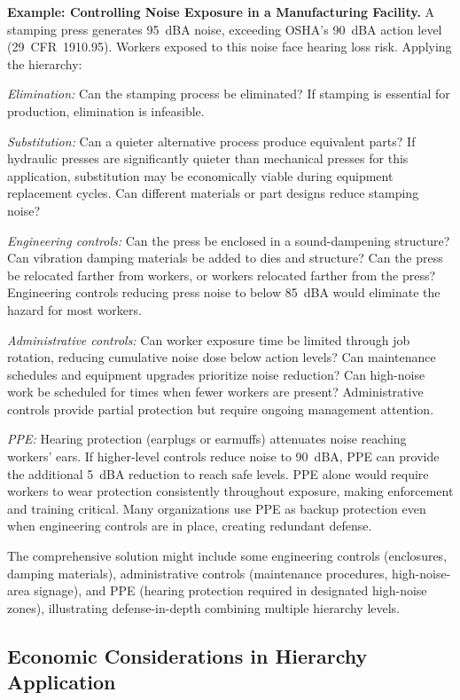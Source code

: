 \documentclass[11pt,openany]{book}
\begin{document}
\textbf{Example: Controlling Noise Exposure in a Manufacturing Facility.}
A stamping press generates 95~dBA noise, exceeding OSHA's 90~dBA action level
(29~CFR~1910.95). Workers exposed to this noise face hearing loss risk.
Applying the hierarchy:

\emph{Elimination:} Can the stamping process be eliminated? If stamping is
essential for production, elimination is infeasible.

\emph{Substitution:} Can a quieter alternative process produce equivalent
parts? If hydraulic presses are significantly quieter than mechanical presses
for this application, substitution may be economically viable during equipment
replacement cycles. Can different materials or part designs reduce stamping
noise?

\emph{Engineering controls:} Can the press be enclosed in a sound-dampening
structure? Can vibration damping materials be added to dies and structure? Can
the press be relocated farther from workers, or workers relocated farther from
the press? Engineering controls reducing press noise to below 85~dBA would
eliminate the hazard for most workers.

\emph{Administrative controls:} Can worker exposure time be limited through
job rotation, reducing cumulative noise dose below action levels? Can
maintenance schedules and equipment upgrades prioritize noise reduction? Can
high-noise work be scheduled for times when fewer workers are present?
Administrative controls provide partial protection but require ongoing
management attention.

\emph{PPE:} Hearing protection (earplugs or earmuffs) attenuates noise
reaching workers' ears. If higher-level controls reduce noise to 90~dBA, PPE
can provide the additional 5~dBA reduction to reach safe levels. PPE alone
would require workers to wear protection consistently throughout exposure,
making enforcement and training critical. Many organizations use PPE as backup
protection even when engineering controls are in place, creating redundant
defense.

The comprehensive solution might include some engineering controls
(enclosures, damping materials), administrative controls (maintenance
procedures, high-noise-area signage), and PPE (hearing protection required in
designated high-noise zones), illustrating defense-in-depth combining multiple
hierarchy levels.

\subsection{Economic Considerations in Hierarchy Application}
\end{document}
